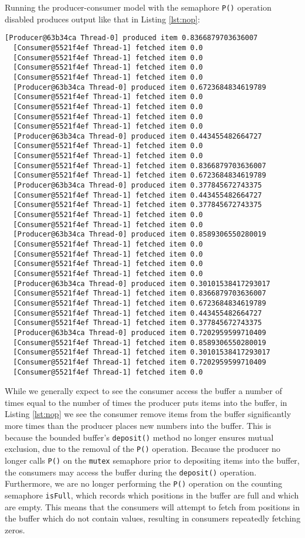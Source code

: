 \documentclass[12pt,a4paper]{article}
\begin{document}
		Running the producer-consumer model with the semaphore \texttt{P()} operation disabled produces output like that in Listing \ref{lst:nop}:
		\begin{lstlisting}[style=log,caption=Output from a defective program with the \texttt{P()} operation disabled., label=lst:nop]
  [Producer@63b34ca Thread-0] produced item 0.8366879703636007
  [Consumer@5521f4ef Thread-1] fetched item 0.0
  [Consumer@5521f4ef Thread-1] fetched item 0.0
  [Consumer@5521f4ef Thread-1] fetched item 0.0
  [Consumer@5521f4ef Thread-1] fetched item 0.0
  [Producer@63b34ca Thread-0] produced item 0.6723684834619789
  [Consumer@5521f4ef Thread-1] fetched item 0.0
  [Consumer@5521f4ef Thread-1] fetched item 0.0
  [Consumer@5521f4ef Thread-1] fetched item 0.0
  [Consumer@5521f4ef Thread-1] fetched item 0.0
  [Producer@63b34ca Thread-0] produced item 0.443455482664727
  [Consumer@5521f4ef Thread-1] fetched item 0.0
  [Consumer@5521f4ef Thread-1] fetched item 0.0
  [Consumer@5521f4ef Thread-1] fetched item 0.8366879703636007
  [Consumer@5521f4ef Thread-1] fetched item 0.6723684834619789
  [Producer@63b34ca Thread-0] produced item 0.377845672743375
  [Consumer@5521f4ef Thread-1] fetched item 0.443455482664727
  [Consumer@5521f4ef Thread-1] fetched item 0.377845672743375
  [Consumer@5521f4ef Thread-1] fetched item 0.0
  [Consumer@5521f4ef Thread-1] fetched item 0.0
  [Producer@63b34ca Thread-0] produced item 0.8589306550280019
  [Consumer@5521f4ef Thread-1] fetched item 0.0
  [Consumer@5521f4ef Thread-1] fetched item 0.0
  [Consumer@5521f4ef Thread-1] fetched item 0.0
  [Consumer@5521f4ef Thread-1] fetched item 0.0
  [Producer@63b34ca Thread-0] produced item 0.30101538417293017
  [Consumer@5521f4ef Thread-1] fetched item 0.8366879703636007
  [Consumer@5521f4ef Thread-1] fetched item 0.6723684834619789
  [Consumer@5521f4ef Thread-1] fetched item 0.443455482664727
  [Consumer@5521f4ef Thread-1] fetched item 0.377845672743375
  [Producer@63b34ca Thread-0] produced item 0.7202959599710409
  [Consumer@5521f4ef Thread-1] fetched item 0.8589306550280019
  [Consumer@5521f4ef Thread-1] fetched item 0.30101538417293017
  [Consumer@5521f4ef Thread-1] fetched item 0.7202959599710409
  [Consumer@5521f4ef Thread-1] fetched item 0.0
		\end{lstlisting}

		While we generally expect to see the consumer access the buffer a number of times equal to the number of times the producer puts items into the buffer, in Listing \ref{lst:nop} we see the consumer remove items from the buffer significantly more times than the producer places new numbers into the buffer. This is because the bounded buffer's \texttt{deposit()} method no longer ensures mutual exclusion, due to the removal of the \texttt{P()} operation. Because the producer no longer calls \texttt{P()} on the \texttt{mutex} semaphore prior to depositing items into the buffer, the consumers may access the buffer during the \texttt{deposit()} operation. Furthermore, we are no longer performing the \texttt{P()} operation on the counting semaphore \texttt{isFull}, which records which positions in the buffer are full and which are empty. This means that the consumers will attempt to fetch from positions in the buffer which do not contain values, resulting in consumers repeatedly fetching zeros.
\end{document}
